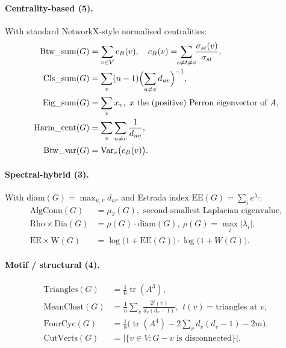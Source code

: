 \documentclass[STIX1COL]{WileyNJDv5}
\theoremstyle{definition}
\begin{document}
\paragraph{Centrality-based (5).}
With standard NetworkX-style normalised centralities:
\begin{align*}
\mathrm{Btw\_sum}(G) &= \sum_{v \in V} c_B(v),\quad c_B(v) = \!\!\sum_{s \ne t \ne v}\!\!
\frac{\sigma_{st}(v)}{\sigma_{st}}, \\
\mathrm{Cls\_sum}(G) &= \sum_{v} (n-1)\Bigl(\sum_{u \ne v} d_{uv}\Bigr)^{-1}, \\
\mathrm{Eig\_sum}(G) &= \sum_{v} x_v,\ x \text{ the (positive) Perron eigenvector of } A, \\
\mathrm{Harm\_cent}(G) &= \sum_{v}\sum_{u \ne v}\frac{1}{d_{uv}}, \\
\mathrm{Btw\_var}(G) &= \mathrm{Var}_v\bigl(c_B(v)\bigr).
\end{align*}

\paragraph{Spectral-hybrid (3).}
With $\mathrm{diam}(G) = \max_{u,v} d_{uv}$ and Estrada index
$\mathrm{EE}(G) = \sum_i e^{\lambda_i}$:
\begin{align*}
\mathrm{AlgConn}(G) &= \mu_2(G), \text{ second-smallest Laplacian eigenvalue}, \\
\mathrm{Rho}\!\times\!\mathrm{Dia}(G) &= \rho(G)\cdot\mathrm{diam}(G),\ \rho(G) = \max_i|\lambda_i|, \\
\mathrm{EE}\!\times\!\mathrm{W}(G) &= \log\bigl(1+\mathrm{EE}(G)\bigr)\cdot\log\bigl(1+W(G)\bigr).
\end{align*}

\paragraph{Motif / structural (4).}
\begin{align*}
\mathrm{Triangles}(G) &= \tfrac{1}{6}\operatorname{tr}(A^3), \\
\mathrm{MeanClust}(G) &= \frac{1}{n}\sum_{v} \frac{2 t(v)}{d_v(d_v-1)},\ \,t(v) = \text{triangles at } v, \\
\mathrm{FourCyc}(G) &= \tfrac{1}{8}\bigl(\operatorname{tr}(A^4) - 2\!\sum_v d_v(d_v - 1) - 2m\bigr), \\
\mathrm{CutVerts}(G) &= |\{v \in V : G - v \text{ is disconnected}\}|.
\end{align*}
\end{document}
